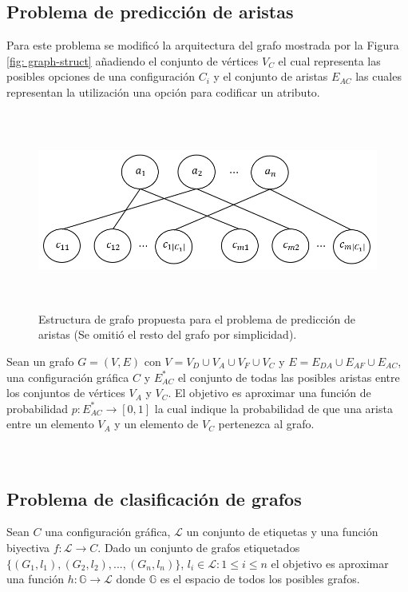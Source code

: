 \subsection{Problema de predicci\'on de aristas}

Para este problema se modific\'o la arquitectura del grafo mostrada por la Figura \ref{fig: graph-struct}
a\~nadiendo el conjunto de v\'ertices $V_C$ el cual representa las posibles opciones de una configuraci\'on $C_i$ y
el conjunto de aristas $E_{AC}$ las cuales representan la utilizaci\'on una opci\'on para codificar un atributo.

\begin{figure}[h!]
    \centering
    \includegraphics[width=130mm, height=65mm]{Graphics/new_link_pred.png}
    \caption{Estructura de grafo propuesta para el problema de predicci\'on de aristas (Se omiti\'o el resto del grafo por simplicidad).}
    \label{fig: link-pred-graph}
\end{figure}

Sean un grafo $G = (V,E)$ con $V = V_D \cup V_A \cup V_F \cup V_C$ y $E = E_{DA} \cup E_{AF} \cup E_{AC}$,
una configuraci\'on gr\'afica $C$ y $E_{AC}^*$ el conjunto de todas las posibles aristas entre los conjuntos de v\'ertices $V_A$ y $V_C$.
El objetivo es aproximar una funci\'on de probabilidad $p : E_{AC}^* \to [0,1]$ la cual indique la probabilidad de que una arista
entre un elemento $V_A$ y un elemento de $V_C$ pertenezca al grafo.\\\\\\

\subsection{Problema de clasificaci\'on de grafos}

Sean $C$ una configuraci\'on gr\'afica, $\mathcal{L}$ un conjunto de etiquetas y
una funci\'on biyectiva $f : \mathcal{L} \to C$. Dado un conjunto
de grafos etiquetados $\{(G_1, l_1), (G_2, l_2),..., (G_n, l_n)\}$, $l_i \in \mathcal{L} : 1 \leq i \leq n$ 
el objetivo es aproximar una funci\'on $h : \mathbb{G} \to \mathcal{L}$ donde
$\mathbb{G}$ es el espacio de todos los posibles grafos.



